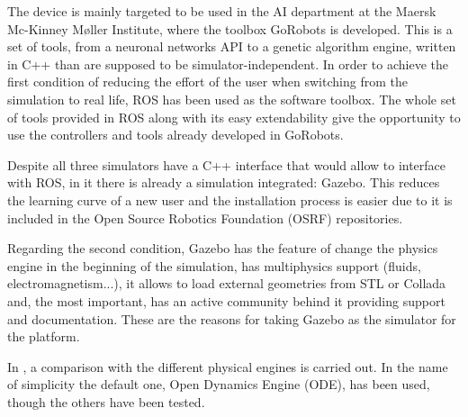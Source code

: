The device is mainly targeted to be used in the AI department at the Maersk Mc-Kinney Møller Institute, where the toolbox GoRobots is developed.
This is a set of tools, from a neuronal networks API to a genetic algorithm engine, written in C++ than are supposed to be simulator-independent.
In order to achieve the first condition of reducing the effort of the user when switching from the simulation to real life, ROS \cite{ros} has been used as the software toolbox.
The whole set of tools provided in ROS along with its easy extendability give the opportunity to use the controllers and tools already developed in GoRobots.

Despite all three simulators have a C++ interface that would allow to interface with ROS, in it there is already a simulation integrated: Gazebo.
This reduces the learning curve of a new user and the installation process is easier due to it is included in the Open Source Robotics Foundation (OSRF) repositories.

Regarding the second condition, Gazebo has the feature of change the physics engine in the beginning of the simulation, has multiphysics support (fluids, electromagnetism...), it allows to load external geometries from STL or Collada and, the most important, has an active community behind it providing support and documentation. These are the reasons for taking Gazebo as the simulator for the platform.

In \cite{physics_engine_gazebo_comparison}, a comparison with the different physical engines is carried out.
In the name of simplicity the default one, Open Dynamics Engine (ODE), has been used, though the others have been tested.

